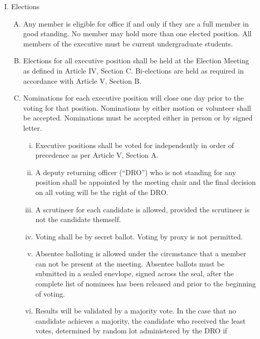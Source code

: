 \documentclass[11pt]{article}
\begin{document}
\begin{enumerate}[I.]
\begin{enumerate}[A)]
\begin{enumerate}[i)]
\begin{enumerate}[a)]
            \end{enumerate}
        \end{enumerate}
    \end{enumerate}
  \item Elections
    \begin{enumerate}[A)]
      \item Any member is eligible for office if and only if they are a full
        member in good standing. No member may hold more than one elected
        position. All members of the executive must be current undergraduate
        students. 
      \item Elections for all executive position shall be held at the Election
        Meeting as defined in Article IV, Section C. Bi-elections are held as
        required in accordance with Article V, Section B. 
      \item  Nominations for each executive position will close one day prior
        to the voting for that position. Nominations by either motion or
        volunteer shall be accepted. Nominations must be accepted either in
        person or by signed letter. 
        \begin{enumerate}[i)]
          \item Executive positions shall be voted for independently in order
            of precedence as per Article V, Section A.
          \item A deputy returning officer (``DRO'') who is not standing for
            any position shall be appointed by the meeting chair and the final
            decision on all voting will be the right of the DRO. 
          \item A scrutineer for each candidate is allowed, provided the
            scrutineer is not the candidate themself. 
          \item Voting shall be by secret ballot. Voting by proxy is not
            permitted.
          \item Absentee balloting is allowed under the circmstance that a
            member can not be present at the meeting. Absentee ballots must be
            submitted in a sealed enevlope, signed across the seal, after the
            complete list of nominees has been released and prior to the
            beginning of voting.
          \item Results will be validated by a majority vote. In the case that
            no candidate achieves a majority, the candidate who received the
            least votes, determined by random lot administered by the DRO if

\end{enumerate}
\end{enumerate}
\end{enumerate}
\end{document}

